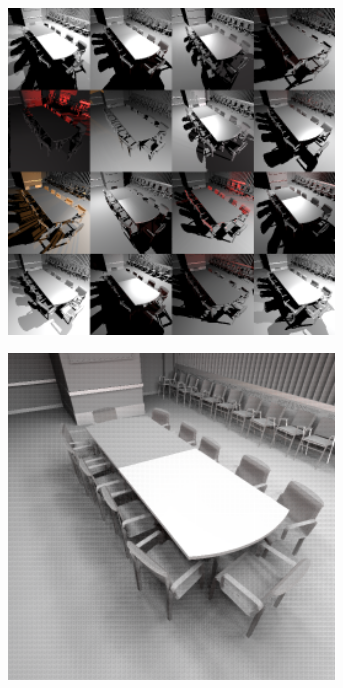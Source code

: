 \begin{figure}[htb]
\begin{subfigure}[b]{0.33\textwidth}
    \caption{\label{fig:concept:interleaved_segovia_2}}
  \end{subfigure}%
  \begin{subfigure}[b]{0.33\textwidth}
    \centering\includegraphics[width=0.95\textwidth]{graphics/interleaved_segovia_3}
    \caption{\label{fig:concept:interleaved_segovia_3}}
  \end{subfigure}
  \begin{subfigure}[b]{0.33\textwidth}
    \centering\includegraphics[width=0.95\textwidth]{graphics/interleaved_segovia_4}

\end{subfigure}
\end{figure}
